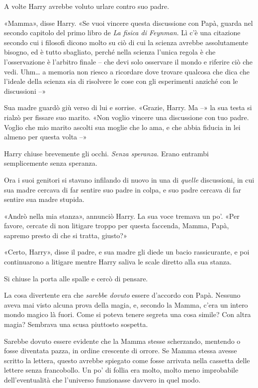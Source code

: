 A volte Harry avrebbe voluto urlare contro suo padre.

«Mamma», disse Harry. «Se vuoi vincere questa discussione con Papà, guarda nel secondo capitolo del primo libro de \emph{La fisica di Feynman}. Lì c’è una citazione secondo cui i filosofi dicono molto su ciò di cui la scienza avrebbe assolutamente bisogno, ed è tutto sbagliato, perché nella scienza l’unica regola è che l’osservazione è l’arbitro finale – che devi solo osservare il mondo e riferire ciò che vedi. Uhm… a memoria non riesco a ricordare dove trovare qualcosa che dica che l’ideale della scienza sia di risolvere le cose con gli esperimenti anziché con le discussioni –»

Sua madre guardò giù verso di lui e sorrise. «Grazie, Harry. Ma –» la sua testa si rialzò per fissare suo marito. «Non voglio vincere una discussione con tuo padre. Voglio che mio marito ascolti sua moglie che lo ama, e che abbia fiducia in lei almeno per questa volta –»

Harry chiuse brevemente gli occhi. \emph{Senza speranza}. Erano entrambi semplicemente senza speranza.

Ora i suoi genitori si stavano infilando di nuovo in una di \emph{quelle} discussioni, in cui sua madre cercava di far sentire suo padre in colpa, e suo padre cercava di far sentire sua madre stupida.

«Andrò nella mia stanza», annunciò Harry. La sua voce tremava un po’. «Per favore, cercate di non litigare troppo per questa faccenda, Mamma, Papà, sapremo presto di che si tratta, giusto?»

«Certo, Harry», disse il padre, e sua madre gli diede un bacio rassicurante, e poi continuarono a litigare mentre Harry saliva le scale diretto alla sua stanza.

Si chiuse la porta alle spalle e cercò di pensare.

La cosa divertente era che \emph{sarebbe dovuto} essere d’accordo con Papà. Nessuno aveva mai visto alcuna prova della magia, e, secondo la Mamma, c’era un intero mondo magico là fuori. Come si poteva tenere segreta una cosa simile? Con altra magia? Sembrava una scusa piuttosto sospetta.

Sarebbe dovuto essere evidente che la Mamma stesse scherzando, mentendo o fosse diventata pazza, in ordine crescente di orrore. Se Mamma stessa avesse scritto la lettera, questo avrebbe spiegato come fosse arrivata nella cassetta delle lettere senza francobollo. Un po’ di follia era molto, molto meno improbabile dell’eventualità che l’universo funzionasse davvero in quel modo.

